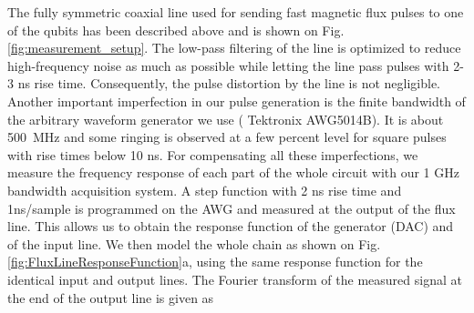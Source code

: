 The fully symmetric coaxial line used for sending fast magnetic flux pulses to one of the qubits has been described above and is shown on Fig. \ref{fig:measurement_setup}. The low-pass filtering of the line is optimized to reduce high-frequency noise as much as possible while letting the line pass pulses with 2-3 ns rise time. Consequently, the pulse  distortion by the line is not negligible. Another important imperfection in our pulse generation is the finite bandwidth of the arbitrary waveform generator we use ( Tektronix AWG5014B). It is about 500~MHz and some ringing is observed at a few percent level for square pulses with rise times below 10 ns. For compensating all these imperfections, we measure the frequency response of each part of the whole circuit with our 1 GHz bandwidth acquisition system. A step function with 2 ns rise time and 1ns/sample is programmed on the AWG and measured at the output of the flux line. This allows us to obtain the response function of the generator (DAC) and of the input line. We then model the whole chain as shown on Fig. \ref{fig:FluxLineResponseFunction}a, using the same response function for the identical input and output lines. The Fourier transform of the measured signal at the end of the output line is given as

